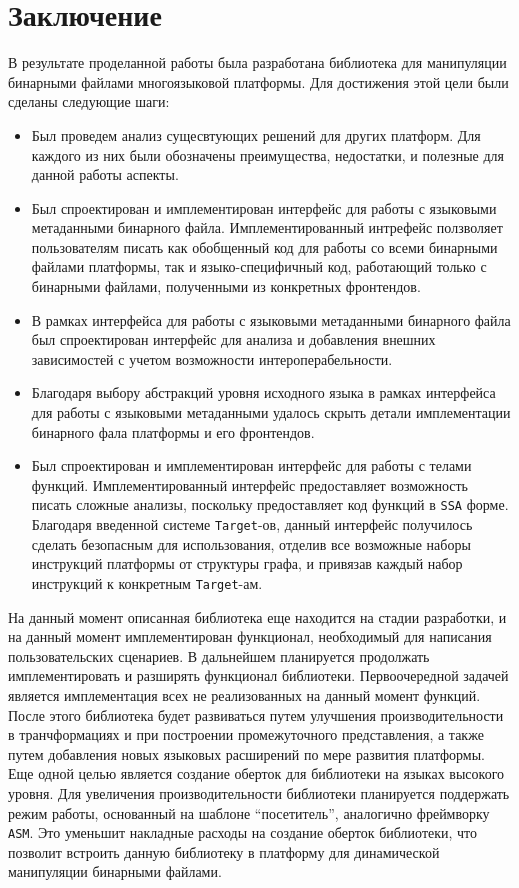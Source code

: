 \section{Заключение}
\label{sec:Chapter5} 

\sloppy

В результате проделанной работы была разработана библиотека для манипуляции бинарными файлами многоязыковой платформы. Для достижения этой цели были сделаны следующие шаги:

\begin{itemize}
    \item Был проведем анализ сущесвтующих решений для других платформ. Для каждого из них были обозначены преимущества, недостатки, и полезные для данной работы аспекты.
    \item Был спроектирован и имплементирован интерфейс для работы с языковыми метаданными бинарного файла. Имплементированный интрефейс ползволяет пользователям писать как обобщенный код для работы со всеми бинарными файлами платформы, так и языко-специфичный код, работающий только с бинарными файлами, полученными из конкретных фронтендов.
    \item В рамках интерфейса для работы с языковыми метаданными бинарного файла был спроектирован интерфейс для анализа и добавления внешних зависимостей с учетом возможности интероперабельности.
    \item Благодаря выбору абстракций уровня исходного языка в рамках интерфейса для работы с языковыми метаданными удалось скрыть детали имплементации бинарного фала платформы и его фронтендов.
    \item Был спроектирован и имплементирован интерфейс для работы с телами функций. Имплементированный интерфейс предоставляет возможность писать сложные анализы, поскольку предоставляет код функций в \texttt{SSA} форме. Благодаря введенной системе \texttt{Target}-ов, данный интерфейс получилось сделать безопасным для использования, отделив все возможные наборы инструкций платформы от структуры графа, и привязав каждый набор инструкций к конкретным \texttt{Target}-ам.
\end{itemize}

На данный момент описанная библиотека еще находится на стадии разработки, и на данный момент имплементирован функционал, необходимый для написания пользовательских сценариев. В дальнейшем планируется продолжать имплементировать и разширять функционал библиотеки. Первоочередной задачей является имплементация всех не реализованных на данный момент функций. После этого библиотека будет развиваться путем улучшения производительности в транчформациях и при построении промежуточного представления, а также путем добавления новых языковых расширений по мере развития платформы. Еще одной целью является создание оберток для библиотеки на языках высокого уровня. Для увеличения производительности библиотеки планируется поддержать режим работы, основанный на шаблоне ``посетитель'', аналогично фреймворку \texttt{ASM}. Это уменьшит накладные расходы на создание оберток библиотеки, что позволит встроить данную библиотеку в платформу для динамической манипуляции бинарными файлами.

\newpage
